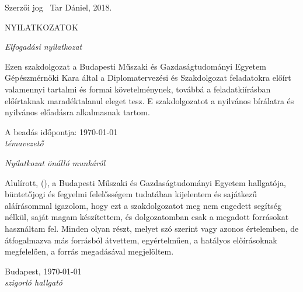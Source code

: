 \documentclass[../main.tex]{subfiles}
\begin{document}
\thispagestyle{empty}
Szerzői jog \textcopyright ~Tar Dániel, 2018.
\newpage

\thispagestyle{empty}

\newpage

% 
\thispagestyle{plain}
\begin{center}
    \Large \MakeUppercase{Nyilatkozatok}
\end{center}





{\centering \itshape Elfogadási nyilatkozat \par}
Ezen szakdolgozat a Budapesti Műszaki és Gazdaságtudományi Egyetem Gépészmérnöki Kara által a Diplomatervezési és Szakdolgozat feladatokra előírt valamennyi tartalmi és formai követelménynek, továbbá a feladatkiírásban előírtaknak maradéktalanul eleget tesz. E szakdolgozatot a nyilvános bírálatra és nyilvános előadásra alkalmasnak tartom. 

A beadás időpontja: \today\\[1cm]

{\hspace{0.62\textwidth} \itshape témavezető}\\[0.1cm]

{\centering \itshape Nyilatkozat önálló munkáról \par}
Alulírott, \textit{\myname} (\myneptun), a Budapesti Műszaki és Gazdaságtudományi Egyetem hallgatója, büntetőjogi és fegyelmi felelősségem tudatában kijelentem és sajátkezű aláírásommal igazolom, hogy ezt a szakdolgozatot meg nem engedett segítség nélkül, saját magam készítettem, és dolgozatomban csak a megadott forrásokat használtam fel. Minden olyan részt, melyet szó szerint vagy azonos értelemben, de átfogalmazva más forrásból átvettem, egyértelműen, a hatályos előírásoknak megfelelően, a forrás megadásával megjelöltem.

{Budapest, \today}\\[1cm]

{\hspace{0.6\textwidth} \itshape szigorló hallgató}
\end{document}
